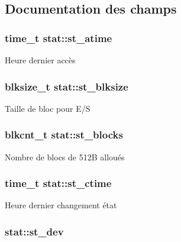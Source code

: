 \subsection{\-Documentation des champs}
\hypertarget{structstat_ab74d1e7e345e88b9d0fb2688a97cba64}{
\subsubsection[{st\-\_\-atime}]{\setlength{\rightskip}{0pt plus 5cm}time\-\_\-t {\bf stat\-::st\-\_\-atime}}}\label{structstat_ab74d1e7e345e88b9d0fb2688a97cba64}
\-Heure dernier accès \hypertarget{structstat_a38d474e1ae3cf6fbdde89ac3c3e308f1}{
\subsubsection[{st\-\_\-blksize}]{\setlength{\rightskip}{0pt plus 5cm}blksize\-\_\-t {\bf stat\-::st\-\_\-blksize}}}\label{structstat_a38d474e1ae3cf6fbdde89ac3c3e308f1}
\-Taille de bloc pour \-E/\-S \hypertarget{structstat_a42dd716b2f9234f961d949fc9500eefb}{
\subsubsection[{st\-\_\-blocks}]{\setlength{\rightskip}{0pt plus 5cm}blkcnt\-\_\-t {\bf stat\-::st\-\_\-blocks}}}\label{structstat_a42dd716b2f9234f961d949fc9500eefb}
\-Nombre de blocs de 512\-B alloués \hypertarget{structstat_a1b4b858db1ebe79c3d6e0fc1ef721024}{
\subsubsection[{st\-\_\-ctime}]{\setlength{\rightskip}{0pt plus 5cm}time\-\_\-t {\bf stat\-::st\-\_\-ctime}}}\label{structstat_a1b4b858db1ebe79c3d6e0fc1ef721024}
\-Heure dernier changement état \hypertarget{structstat_ac5b90090ae323741ae4c9e4f3683a29f}{
\subsubsection[{st\-\_\-dev}]{ {\bf stat\-::st\-\_\-dev}}}\label{structstat_ac5b90090ae323741ae4c9e4f3683a29f}
